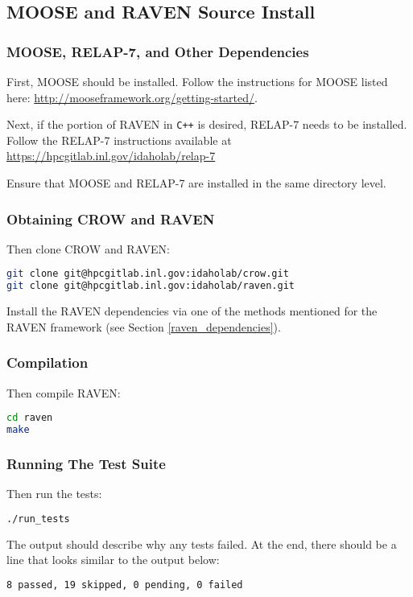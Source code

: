 \subsection{MOOSE and RAVEN Source Install}

\subsubsection{MOOSE, RELAP-7, and Other Dependencies}
First, MOOSE should be installed.  Follow the instructions for MOOSE listed
here: \url{http://mooseframework.org/getting-started/}.

Next, if the portion of RAVEN in \texttt{C++} is desired, RELAP-7 needs to be installed.
%
Follow the RELAP-7 instructions available at \url{https://hpcgitlab.inl.gov/idaholab/relap-7}

Ensure that MOOSE and RELAP-7 are installed in the same directory level.

\subsubsection{Obtaining CROW and RAVEN}
Then clone CROW and RAVEN:

\begin{lstlisting}[language=bash]
git clone git@hpcgitlab.inl.gov:idaholab/crow.git
git clone git@hpcgitlab.inl.gov:idaholab/raven.git
\end{lstlisting}

Install the RAVEN dependencies via one of the methods mentioned for
the RAVEN framework (see Section \ref{raven_dependencies}).

\subsubsection{Compilation}

Then compile RAVEN:

\begin{lstlisting}[language=bash]
cd raven
make
\end{lstlisting}

\subsubsection{Running The Test Suite}
Then run the tests:

\begin{lstlisting}[language=bash]
./run_tests
\end{lstlisting}

The output should describe why any tests failed.
%
At the end, there should be a line that looks similar to the output below:
\begin{lstlisting}[language=bash]
8 passed, 19 skipped, 0 pending, 0 failed
\end{lstlisting}
